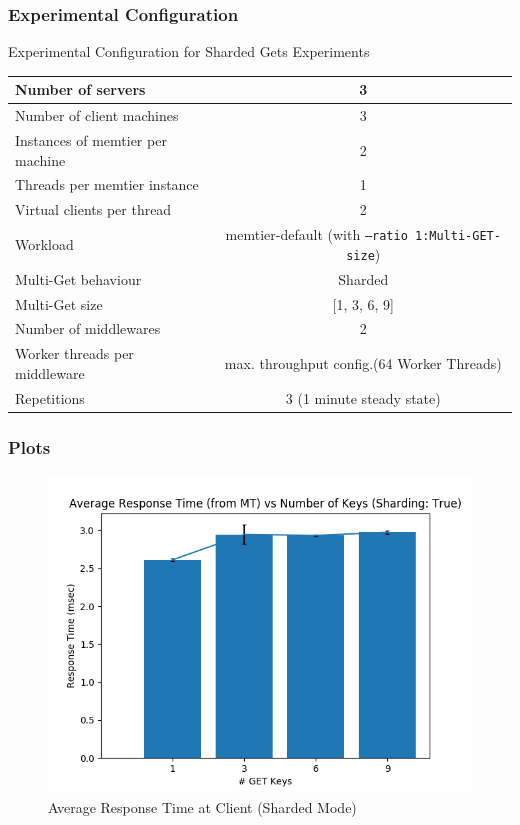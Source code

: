 \documentclass[11pt,a4paper]{article}
\begin{document}
\subsubsection{Experimental Configuration}
\begin{center}
	\scriptsize{
		Experimental Configuration for Sharded Gets Experiments
		\begin{tabular}{|l|c|}
			\hline Number of servers                & 3                       \\ 
			\hline Number of client machines        & 3                       \\ 
			\hline Instances of memtier per machine & 2                       \\ 
			\hline Threads per memtier instance     & 1                       \\
			\hline Virtual clients per thread       & 2     		            \\ 
			\hline Workload                         & memtier-default (with \texttt{--ratio 1:Multi-GET-size}) \\
			\hline Multi-Get behaviour               & Sharded                 \\
			\hline Multi-Get size                   & [1, 3, 6, 9]                  \\
			\hline Number of middlewares            & 2                       \\
			\hline Worker threads per middleware    & max. throughput config.(64 Worker Threads) \\
			\hline Repetitions                      & 3 (1 minute steady state)\\ 
			\hline 
		\end{tabular}
	} 
\end{center}

\subsubsection{Plots}
	\begin{figure}[H]
		\captionsetup{font=scriptsize,labelfont=scriptsize,justification=centering}
		\centering
		\includegraphics[scale=0.5]{images/5_shard_True_avg_r_times_mt.png}
		\caption{Average Response Time at Client (Sharded Mode)}
	\end{figure}
\end{document}
